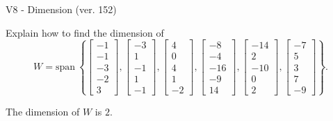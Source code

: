 \begin{exercise}
  \begin{exerciseTitle}V8 - Dimension (ver. 152)\end{exerciseTitle}
  \begin{exerciseStatement}
    Explain how to find the dimension of 
\[W=\mathrm{span}\ \left\{\left[\begin{array}{r}
-1 \\
-1 \\
-3 \\
-2 \\
3
\end{array}\right] , \left[\begin{array}{r}
-3 \\
1 \\
-1 \\
1 \\
-1
\end{array}\right] , \left[\begin{array}{r}
4 \\
0 \\
4 \\
1 \\
-2
\end{array}\right] , \left[\begin{array}{r}
-8 \\
-4 \\
-16 \\
-9 \\
14
\end{array}\right] , \left[\begin{array}{r}
-14 \\
2 \\
-10 \\
0 \\
2
\end{array}\right] , \left[\begin{array}{r}
-7 \\
5 \\
3 \\
7 \\
-9
\end{array}\right]\right\}.\]



  \end{exerciseStatement}
  \begin{exerciseAnswer}
   The dimension of \(W\) is  \(2\).
  


  \end{exerciseAnswer}
\end{exercise}